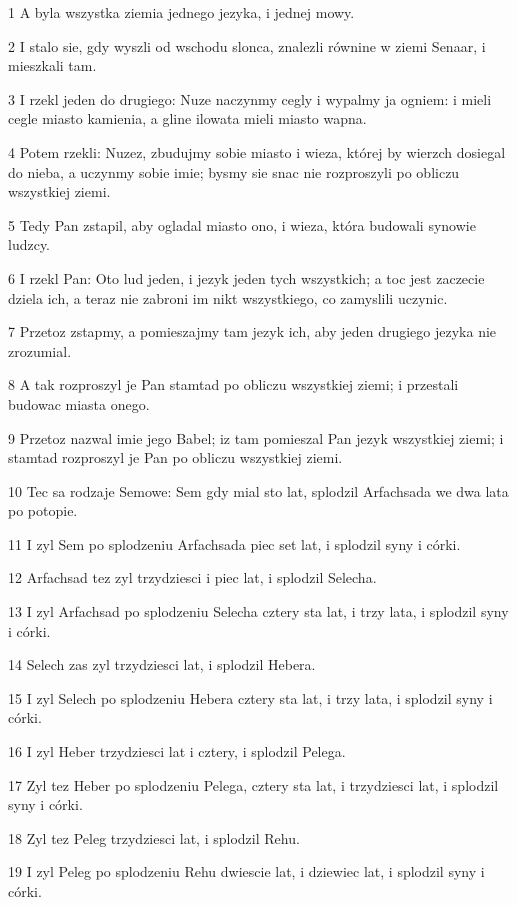 \par 1 A byla wszystka ziemia jednego jezyka, i jednej mowy.
\par 2 I stalo sie, gdy wyszli od wschodu slonca, znalezli równine w ziemi Senaar, i mieszkali tam.
\par 3 I rzekl jeden do drugiego: Nuze naczynmy cegly i wypalmy ja ogniem: i mieli cegle miasto kamienia, a gline ilowata mieli miasto wapna.
\par 4 Potem rzekli: Nuzez, zbudujmy sobie miasto i wieza, której by wierzch dosiegal do nieba, a uczynmy sobie imie; bysmy sie snac nie rozproszyli po obliczu wszystkiej ziemi.
\par 5 Tedy Pan zstapil, aby ogladal miasto ono, i wieza, która budowali synowie ludzcy.
\par 6 I rzekl Pan: Oto lud jeden, i jezyk jeden tych wszystkich; a toc jest zaczecie dziela ich, a teraz nie zabroni im nikt wszystkiego, co zamyslili uczynic.
\par 7 Przetoz zstapmy, a pomieszajmy tam jezyk ich, aby jeden drugiego jezyka nie zrozumial.
\par 8 A tak rozproszyl je Pan stamtad po obliczu wszystkiej ziemi; i przestali budowac miasta onego.
\par 9 Przetoz nazwal imie jego Babel; iz tam pomieszal Pan jezyk wszystkiej ziemi; i stamtad rozproszyl je Pan po obliczu wszystkiej ziemi.
\par 10 Tec sa rodzaje Semowe: Sem gdy mial sto lat, splodzil Arfachsada we dwa lata po potopie.
\par 11 I zyl Sem po splodzeniu Arfachsada piec set lat, i splodzil syny i córki.
\par 12 Arfachsad tez zyl trzydziesci i piec lat, i splodzil Selecha.
\par 13 I zyl Arfachsad po splodzeniu Selecha cztery sta lat, i trzy lata, i splodzil syny i córki.
\par 14 Selech zas zyl trzydziesci lat, i splodzil Hebera.
\par 15 I zyl Selech po splodzeniu Hebera cztery sta lat, i trzy lata, i splodzil syny i córki.
\par 16 I zyl Heber trzydziesci lat i cztery, i splodzil Pelega.
\par 17 Zyl tez Heber po splodzeniu Pelega, cztery sta lat, i trzydziesci lat, i splodzil syny i córki.
\par 18 Zyl tez Peleg trzydziesci lat, i splodzil Rehu.
\par 19 I zyl Peleg po splodzeniu Rehu dwiescie lat, i dziewiec lat, i splodzil syny i córki.
